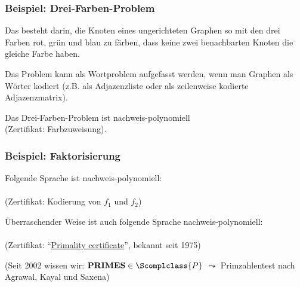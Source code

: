 \documentclass[aspectratio=1610,onlymath]{beamer}
\begin{document}
\begin{frame}\frametitle{Beispiel: Drei-Farben-Problem}

Das  besteht darin, die Knoten eines ungerichteten Graphen so mit den
drei Farben rot, grün und blau zu färben, dass keine zwei benachbarten Knoten die gleiche Farbe haben.
\medskip

\pause

\medskip
Das Problem kann als Wortproblem aufgefasst werden, wenn man Graphen als Wörter kodiert (z.B. als Adjazenzliste oder als zeilenweise kodierte Adjazenzmatrix).
\medskip

\alert{Das Drei-Farben-Problem ist nachweis-polynomiell}\\ (Zertifikat: Farbzuweisung).

\end{frame}

\begin{frame}\frametitle{Beispiel: Faktorisierung}

\medskip

Folgende Sprache ist nachweis-polynomiell:\\[1ex]
\\[1ex]
(Zertifikat: Kodierung von $f_1$ und $f_2$)
\bigskip\pause

Überraschender Weise ist auch folgende Sprache nachweis-polynomiell:\\[1ex]
\\[1ex]
(Zertifikat: "`\href{https://en.wikipedia.org/wiki/Primality_certificate}{Primality certificate}"', bekannt seit 1975)
\bigskip\pause

\textcolor{devilscss}{(Seit 2002 wissen wir: $\textbf{PRIMES}\in\Scomplclass{P}$}
\textcolor{devilscss}{$\leadsto$ Primzahlentest nach Agrawal, Kayal und Saxena)}

\end{frame}
\end{document}
